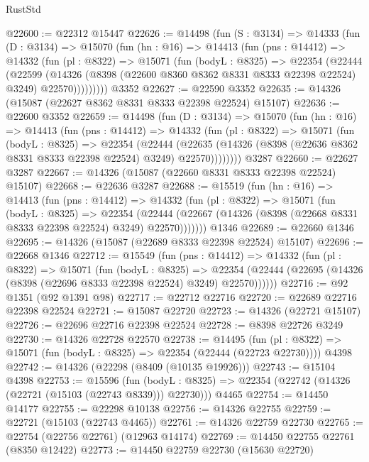 \begin{lexlean}{RustStd}
\begin{coremodule}
@22600 := @22312 @15447
@22626 := @14498
    (fun (S : @3134) =>
    @14333
      (fun (D : @3134) =>
      @15070
        (fun (hn : @16) =>
        @14413
          (fun (pns : @14412) =>
          @14332
            (fun (pl : @8322) =>
            @15071
              (fun (bodyL : @8325) =>
              @22354
                (@22444
                  (@22599
                    (@14326
                      (@8398 (@22600 @8360 @8362 @8331 @8333 @22398 @22524) @3249)
                      @22570)))))))))
    @3352
@22627 := @22590 @3352
@22635 := @14326 (@15087 (@22627 @8362 @8331 @8333 @22398 @22524) @15107)
@22636 := @22600 @3352
@22659 := @14498
    (fun (D : @3134) =>
    @15070
      (fun (hn : @16) =>
      @14413
        (fun (pns : @14412) =>
        @14332
          (fun (pl : @8322) =>
          @15071
            (fun (bodyL : @8325) =>
            @22354
              (@22444
                (@22635
                  (@14326 (@8398 (@22636 @8362 @8331 @8333 @22398 @22524) @3249) @22570))))))))
    @3287
@22660 := @22627 @3287
@22667 := @14326 (@15087 (@22660 @8331 @8333 @22398 @22524) @15107)
@22668 := @22636 @3287
@22688 := @15519
    (fun (hn : @16) =>
    @14413
      (fun (pns : @14412) =>
      @14332
        (fun (pl : @8322) =>
        @15071
          (fun (bodyL : @8325) =>
          @22354
            (@22444 (@22667 (@14326 (@8398 (@22668 @8331 @8333 @22398 @22524) @3249) @22570)))))))
    @1346
@22689 := @22660 @1346
@22695 := @14326 (@15087 (@22689 @8333 @22398 @22524) @15107)
@22696 := @22668 @1346
@22712 := @15549
    (fun (pns : @14412) =>
    @14332
      (fun (pl : @8322) =>
      @15071
        (fun (bodyL : @8325) =>
        @22354 (@22444 (@22695 (@14326 (@8398 (@22696 @8333 @22398 @22524) @3249) @22570))))))
@22716 := @92 @1351 (@92 @1391 @98)
@22717 := @22712 @22716
@22720 := @22689 @22716 @22398 @22524
@22721 := @15087 @22720
@22723 := @14326 (@22721 @15107)
@22726 := @22696 @22716 @22398 @22524
@22728 := @8398 @22726 @3249
@22730 := @14326 @22728 @22570
@22738 := @14495
    (fun (pl : @8322) => @15071 (fun (bodyL : @8325) => @22354 (@22444 (@22723 @22730))))
    @4398
@22742 := @14326 (@22298 (@8409 (@10135 @19926)))
@22743 := @15104 @4398
@22753 := @15596
    (fun (bodyL : @8325) => @22354 (@22742 (@14326 (@22721 (@15103 (@22743 @8339))) @22730)))
    @4465
@22754 := @14450 @14177
@22755 := @22298 @10138
@22756 := @14326 @22755
@22759 := @22721 (@15103 (@22743 @4465))
@22761 := @14326 @22759 @22730
@22765 := @22754 (@22756 @22761) (@12963 @14174)
@22769 := @14450 @22755 @22761 (@8350 @12422)
@22773 := @14450 @22759 @22730 (@15630 @22720)

\end{coremodule}
\end{lexlean}

